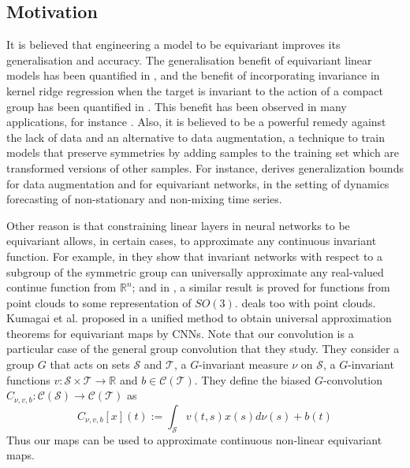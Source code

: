 \documentclass{article}
\theoremstyle{definition}
\begin{document}
\subsection{Motivation}\label{sec:related2}
It is believed that engineering a model to be equivariant improves its generalisation and accuracy.  The generalisation benefit of equivariant linear models has been quantified in \cite{elesedy2021provably}, and the  benefit of incorporating invariance in kernel ridge regression when the target is invariant to the action of a compact group has been quantified in \cite{elesedy2021kernel}. This benefit has been observed in many applications, for instance \cite{wang2021incorporating}. Also, it is believed to be a powerful remedy against the lack of data and an alternative to data augmentation, a technique to train models that preserve symmetries by adding samples to the training set which are transformed versions of other samples. For instance, \cite{wang2022data} derives generalization bounds for data augmentation and for equivariant networks, in the setting of dynamics forecasting of non-stationary and
non-mixing time series.

Other reason is that constraining linear layers in neural networks to be equivariant allows, in certain cases, to approximate any continuous invariant function. For example, in \cite{yarotsky2018universal} they show that invariant networks with respect to a subgroup of the symmetric group can universally approximate any real-valued continue function from $\mathbb{R}^n$; and in \cite{dym2020universality}, a similar result is proved for functions from point clouds to some representation of $SO(3)$. \cite{bokman2022zz} deals too with point clouds. Kumagai et al. proposed in \cite{kumagai2020universal} a unified method to obtain universal approximation theorems for equivariant maps by CNNs. Note that our convolution is a particular case of the general group convolution that they study. They consider a group $G$ that acts on sets $\mathcal{S}$ and $\mathcal{T}$, a $G$-invariant measure $\nu$ on $\mathcal{S}$, a $G$-invariant functions $v: \mathcal{S} \times \mathcal{T} \rightarrow \mathbb{R}$ and $b \in \mathcal{C}(\mathcal{T})$. They define the biased $G$-convolution $C_{\nu, v, b}: \mathcal{C}(\mathcal{S}) \rightarrow \mathcal{C}(\mathcal{T})$ as
\begin{equation}
C_{\nu, v, b}[x](t):=\int_{\mathcal{S}} v(t, s) x(s) d \nu(s)+b(t)
\end{equation}
Thus our maps can be used to approximate continuous non-linear equivariant maps.
\end{document}
